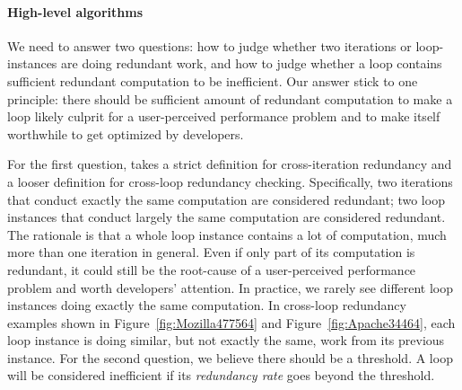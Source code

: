 \paragraph{High-level algorithms}
We need to answer two questions:
how to judge whether
two iterations or loop-instances are doing redundant work, and
how to judge whether a loop contains sufficient redundant
computation to be inefficient.
Our answer stick to one principle: there should be
sufficient amount of redundant computation to make a loop likely culprit
for a user-perceived performance problem and to make itself worthwhile to
get optimized by developers. 

For the first question, \Tool takes a strict 
definition for cross-iteration redundancy and a looser definition for
cross-loop redundancy checking. Specifically,
two iterations that conduct exactly the same computation are
considered redundant; two loop instances that conduct largely
the same computation are considered redundant.
The rationale is that 
a whole loop instance contains a lot of computation, much more than
one iteration in general. Even if only part of its computation
is redundant, it could still be the root-cause of a user-perceived performance
problem and worth developers' attention. 
In practice, we rarely see different loop 
instances doing exactly the same computation.
In cross-loop redundancy examples shown in 
Figure~\ref{fig:Mozilla477564} and
Figure~\ref{fig:Apache34464}, each loop instance is doing similar, but not
exactly the same, work from its previous instance.
For the second question, we believe there should be a threshold. 
A loop will be considered inefficient if its \textit{redundancy rate} goes
beyond the threshold.






